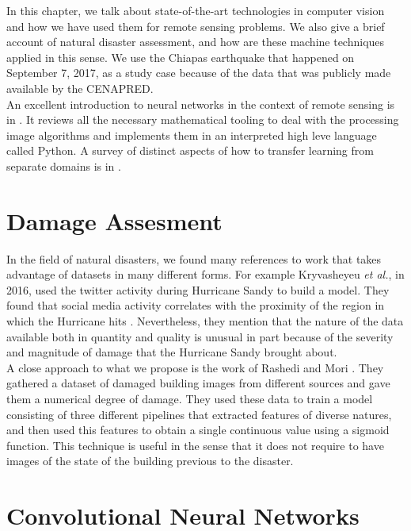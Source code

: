 In this chapter, we talk about state-of-the-art technologies in computer vision and how we have used them for remote sensing problems. We also give a brief account of natural disaster assessment, and how are these machine techniques applied in this sense. We use the Chiapas earthquake that happened on September 7, 2017, as a study case because of the data that was publicly made available by the CENAPRED.\\

An excellent introduction to neural networks in the context of remote sensing is in \cite{canty2014image}. It reviews all the necessary mathematical tooling to deal with the processing image algorithms and implements them in an interpreted high leve language called Python. A survey of distinct aspects of how to transfer learning from separate domains is in \cite{5288526}.\\

\section{Damage Assesment}

In the field of natural disasters, we found many references to work that takes advantage of datasets in many different forms. For example Kryvasheyeu \textit{et al.}, in 2016, used the twitter activity during  Hurricane Sandy to build a model. They found that social media activity correlates with the proximity of the region in which the Hurricane hits \cite{Kryvasheyeue1500779}. Nevertheless, they mention that the nature of the data available both in quantity and quality is unusual in part because of the severity and magnitude of damage that the Hurricane Sandy brought about.\\

A close approach to what we propose is the work of Rashedi and Mori \cite{Nia2017BuildingDA}. They gathered a dataset of damaged building images from different sources and gave them a numerical degree of damage. They used these data to train a model consisting of three different pipelines that extracted features of diverse natures, and then used this features to obtain a single continuous value using a sigmoid function. This technique is useful in the sense that it does not require to have images of the state of the building previous to the disaster.\\


\section{Convolutional Neural Networks}

